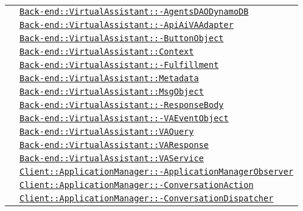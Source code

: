 \begin{longtable}{|>{\centering}m{3cm}|m{10cm}<{\centering}|}
& \hyperref[Back-end::VirtualAssistant::AgentsDAODynamoDB]{\texttt{Back-end::VirtualAssistant::-\linebreak AgentsDAODynamoDB}}\\
& \hyperref[Back-end::VirtualAssistant::ApiAiVAAdapter]{\texttt{Back-end::VirtualAssistant::-\linebreak ApiAiVAAdapter}}\\
& \hyperref[Back-end::VirtualAssistant::ButtonObject]{\texttt{Back-end::VirtualAssistant::-\linebreak ButtonObject}}\\
& \hyperref[Back-end::VirtualAssistant::Context]{\texttt{Back-end::VirtualAssistant::Context}}\\
& \hyperref[Back-end::VirtualAssistant::Fulfillment]{\texttt{Back-end::VirtualAssistant::-\linebreak Fulfillment}}\\
& \hyperref[Back-end::VirtualAssistant::Metadata]{\texttt{Back-end::VirtualAssistant::Metadata}}\\
& \hyperref[Back-end::VirtualAssistant::MsgObject]{\texttt{Back-end::VirtualAssistant::MsgObject}}\\
& \hyperref[Back-end::VirtualAssistant::ResponseBody]{\texttt{Back-end::VirtualAssistant::-\linebreak ResponseBody}}\\
& \hyperref[Back-end::VirtualAssistant::VAEventObject]{\texttt{Back-end::VirtualAssistant::-\linebreak VAEventObject}}\\
& \hyperref[Back-end::VirtualAssistant::VAQuery]{\texttt{Back-end::VirtualAssistant::VAQuery}}\\
& \hyperref[Back-end::VirtualAssistant::VAResponse]{\texttt{Back-end::VirtualAssistant::VAResponse}}\\
& \hyperref[Back-end::VirtualAssistant::VAService]{\texttt{Back-end::VirtualAssistant::VAService}}\\
& \hyperref[Client::ApplicationManager::ApplicationManagerObserver]{\texttt{Client::ApplicationManager::-\linebreak ApplicationManagerObserver}}\\
& \hyperref[Client::ApplicationManager::ConversationAction]{\texttt{Client::ApplicationManager::-\linebreak ConversationAction}}\\
& \hyperref[Client::ApplicationManager::ConversationDispatcher]{\texttt{Client::ApplicationManager::-\linebreak ConversationDispatcher}}\\

\end{longtable}

